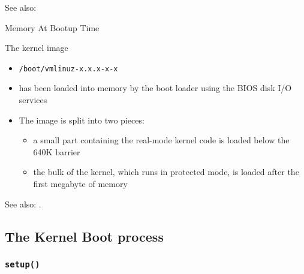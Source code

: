 See also: 

\begin{frame}{Memory At Bootup Time}
  \begin{varwidth}{.7\textwidth}
    \begin{block}{The kernel image}
      \begin{itemize}
      \item \texttt{/boot/vmlinuz-x.x.x-x-x}
      \item has been loaded into memory by the boot loader using the BIOS disk I/O
        services
      \item The image is split into two pieces:
        \begin{itemize}
        \item a small part containing the real-mode kernel code is loaded below the 640K
          barrier
        \item the bulk of the kernel, which runs in protected mode, is loaded after the
          first megabyte of memory
        \end{itemize}
      \end{itemize}
    \end{block}
  \end{varwidth}\hfill
  \begin{varwidth}{.25\textwidth}\label{fig:boot-mem3}
    \begin{center}
    \end{center}
  \end{varwidth}
\end{frame}

See also: .

\subsection{The Kernel Boot process}

\subsubsection{\texttt{setup()}}

